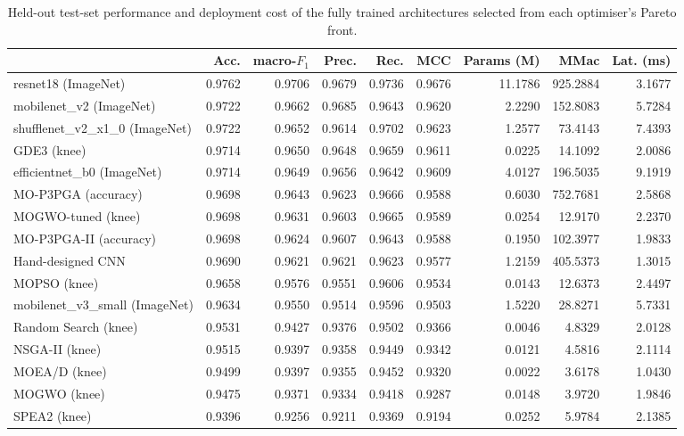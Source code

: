 \begin{table}[htbp]
\centering
\caption{Held-out test-set performance and deployment cost of the fully trained architectures selected from each optimiser's Pareto front.}
\label{tab:testresults}
\footnotesize
\begin{tabular}{lrrrrrrrr}
\toprule
 & Acc. & macro-$F_1$ & Prec. & Rec. & MCC & Params (M) & MMac & Lat. (ms) \\
\midrule
resnet18 (ImageNet) & 0.9762 & 0.9706 & 0.9679 & 0.9736 & 0.9676 & 11.1786 & 925.2884 & 3.1677 \\
mobilenet\_v2 (ImageNet) & 0.9722 & 0.9662 & 0.9685 & 0.9643 & 0.9620 & 2.2290 & 152.8083 & 5.7284 \\
shufflenet\_v2\_x1\_0 (ImageNet) & 0.9722 & 0.9652 & 0.9614 & 0.9702 & 0.9623 & 1.2577 & 73.4143 & 7.4393 \\
GDE3 (knee) & 0.9714 & 0.9650 & 0.9648 & 0.9659 & 0.9611 & 0.0225 & 14.1092 & 2.0086 \\
efficientnet\_b0 (ImageNet) & 0.9714 & 0.9649 & 0.9656 & 0.9642 & 0.9609 & 4.0127 & 196.5035 & 9.1919 \\
MO-P3PGA (accuracy) & 0.9698 & 0.9643 & 0.9623 & 0.9666 & 0.9588 & 0.6030 & 752.7681 & 2.5868 \\
MOGWO-tuned (knee) & 0.9698 & 0.9631 & 0.9603 & 0.9665 & 0.9589 & 0.0254 & 12.9170 & 2.2370 \\
MO-P3PGA-II (accuracy) & 0.9698 & 0.9624 & 0.9607 & 0.9643 & 0.9588 & 0.1950 & 102.3977 & 1.9833 \\
Hand-designed CNN & 0.9690 & 0.9621 & 0.9621 & 0.9623 & 0.9577 & 1.2159 & 405.5373 & 1.3015 \\
MOPSO (knee) & 0.9658 & 0.9576 & 0.9551 & 0.9606 & 0.9534 & 0.0143 & 12.6373 & 2.4497 \\
mobilenet\_v3\_small (ImageNet) & 0.9634 & 0.9550 & 0.9514 & 0.9596 & 0.9503 & 1.5220 & 28.8271 & 5.7331 \\
Random Search (knee) & 0.9531 & 0.9427 & 0.9376 & 0.9502 & 0.9366 & 0.0046 & 4.8329 & 2.0128 \\
NSGA-II (knee) & 0.9515 & 0.9397 & 0.9358 & 0.9449 & 0.9342 & 0.0121 & 4.5816 & 2.1114 \\
MOEA/D (knee) & 0.9499 & 0.9397 & 0.9355 & 0.9452 & 0.9320 & 0.0022 & 3.6178 & 1.0430 \\
MOGWO (knee) & 0.9475 & 0.9371 & 0.9334 & 0.9418 & 0.9287 & 0.0148 & 3.9720 & 1.9846 \\
SPEA2 (knee) & 0.9396 & 0.9256 & 0.9211 & 0.9369 & 0.9194 & 0.0252 & 5.9784 & 2.1385 \\

\end{tabular}
\end{table}
